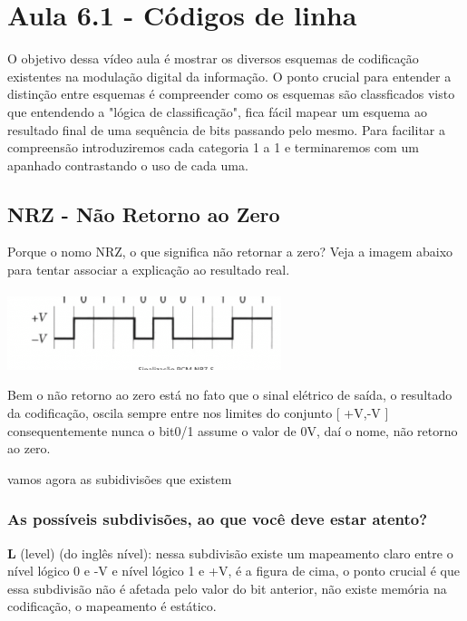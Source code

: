 \section{Aula 6.1 - Códigos de linha}

O objetivo dessa vídeo aula é mostrar os diversos esquemas de codificação existentes na modulação digital da informação.
O ponto crucial para entender a distinção entre esquemas é compreender como os esquemas são classficados visto que entendendo a "lógica de classificação",
fica fácil mapear um esquema ao resultado final de uma sequência de bits passando pelo mesmo. Para facilitar a compreensão introduziremos cada categoria 1 a 1 e terminaremos
com um apanhado contrastando o uso de cada uma.

\subsection{NRZ - Não Retorno ao Zero}

Porque o nomo NRZ, o que significa não retornar a zero? Veja a imagem abaixo para tentar associar a explicação ao resultado real.
\\\\
\includegraphics[width=0.6\textwidth]{../assets/nrz.png}\cite{dc}

Bem o não retorno ao zero está no fato que o sinal elétrico de saída, o resultado da codificação, oscila sempre entre nos limites do conjunto [ +V,-V ] consequentemente nunca o bit0/1 assume o valor
de 0V, daí o nome, não retorno ao zero.

vamos agora as subidivisões que existem

\subsubsection{As possíveis subdivisões, ao que você deve estar atento?}

\textbf{L} (level) (do inglês nível): nessa subdivisão existe um mapeamento claro entre o nível lógico 0 e -V e nível lógico 1 e +V, é a figura de cima, o ponto crucial é que essa subdivisão
não é afetada pelo valor do bit anterior, não existe memória na codificação, o mapeamento é estático.
\\

